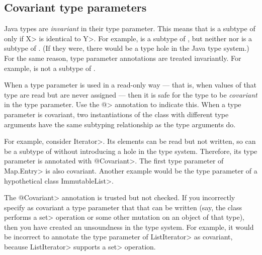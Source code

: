 



\subsection{Covariant type parameters\label{covariant-type-parameters}}

Java types are \emph{invariant} in their type parameter.  This means that
 is a subtype of  only if \<X> is identical to \<Y>.  For
example,  is a subtype of , but
neither  nor  is a subtype of
.  (If they were, there would be a type hole in the Java
type system.)  For the same reason, type parameter annotations are treated
invariantly.  For example,  is not a subtype
of .

When a type parameter is used in a read-only way --- that is, when values
of that type are read but are never assigned --- then it is safe for the
type to be \emph{covariant} in the type parameter.  Use the \<@> annotation to indicate
this.
When a type parameter is covariant, two instantiations of the class with
different type arguments have the same subtyping relationship as the type
arguments do.

For example, consider \<Iterator>.  Its elements can be read but not
written, so  can be a subtype of
 without introducing a hole in the type system.
Therefore, its type parameter is annotated with \<@Covariant>.
The first type parameter of \<Map.Entry> is also covariant.
Another example would be the type parameter of a hypothetical class
\<ImmutableList>. 

The \<@Covariant> annotation is trusted but not checked.
If you incorrectly specify as covariant a type parameter that that can be
written (say, the class performs a
\<set> operation or some other mutation on an object of that type), then
you have created an unsoundness in the type system.
For example, it would be incorrect to annotate the type parameter of
\<ListIterator> as covariant, because \<ListIterator> supports a \<set>
operation.


